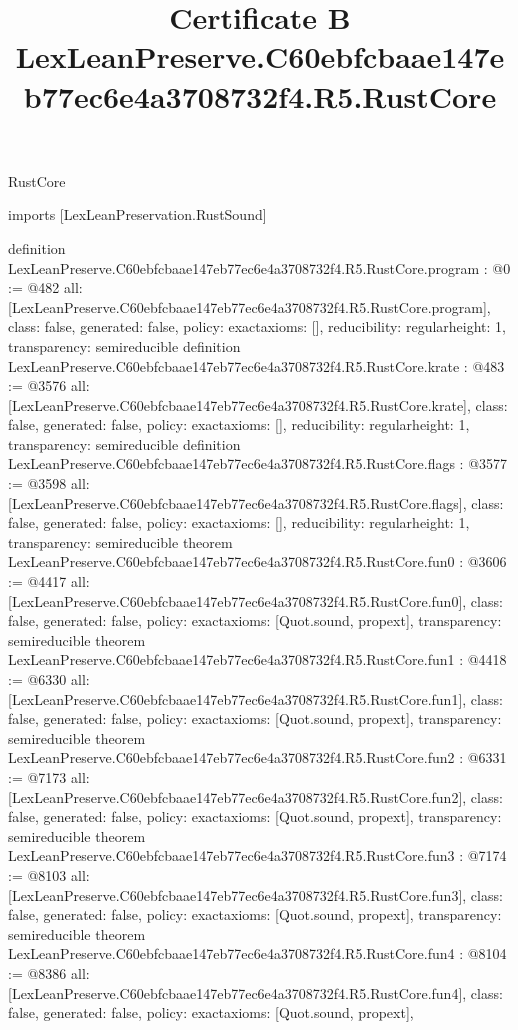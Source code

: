 \begin{lexlean}{RustCore}
\title{Certificate B LexLeanPreserve.C60ebfcbaae147eb77ec6e4a3708732f4.R5.RustCore}
\begin{coremodule}
imports [LexLeanPreservation.RustSound]

definition LexLeanPreserve.C60ebfcbaae147eb77ec6e4a3708732f4.R5.RustCore.program : @0 := @482 {
  all: [LexLeanPreserve.C60ebfcbaae147eb77ec6e4a3708732f4.R5.RustCore.program],
  class: false,
  generated: false,
  policy: exact{axioms: []},
  reducibility: regular{height: 1},
  transparency: semireducible
}
definition LexLeanPreserve.C60ebfcbaae147eb77ec6e4a3708732f4.R5.RustCore.krate : @483 := @3576 {
  all: [LexLeanPreserve.C60ebfcbaae147eb77ec6e4a3708732f4.R5.RustCore.krate],
  class: false,
  generated: false,
  policy: exact{axioms: []},
  reducibility: regular{height: 1},
  transparency: semireducible
}
definition LexLeanPreserve.C60ebfcbaae147eb77ec6e4a3708732f4.R5.RustCore.flags : @3577 := @3598 {
  all: [LexLeanPreserve.C60ebfcbaae147eb77ec6e4a3708732f4.R5.RustCore.flags],
  class: false,
  generated: false,
  policy: exact{axioms: []},
  reducibility: regular{height: 1},
  transparency: semireducible
}
theorem LexLeanPreserve.C60ebfcbaae147eb77ec6e4a3708732f4.R5.RustCore.fun0 : @3606 := @4417 {
  all: [LexLeanPreserve.C60ebfcbaae147eb77ec6e4a3708732f4.R5.RustCore.fun0],
  class: false,
  generated: false,
  policy: exact{axioms: [Quot.sound, propext]},
  transparency: semireducible
}
theorem LexLeanPreserve.C60ebfcbaae147eb77ec6e4a3708732f4.R5.RustCore.fun1 : @4418 := @6330 {
  all: [LexLeanPreserve.C60ebfcbaae147eb77ec6e4a3708732f4.R5.RustCore.fun1],
  class: false,
  generated: false,
  policy: exact{axioms: [Quot.sound, propext]},
  transparency: semireducible
}
theorem LexLeanPreserve.C60ebfcbaae147eb77ec6e4a3708732f4.R5.RustCore.fun2 : @6331 := @7173 {
  all: [LexLeanPreserve.C60ebfcbaae147eb77ec6e4a3708732f4.R5.RustCore.fun2],
  class: false,
  generated: false,
  policy: exact{axioms: [Quot.sound, propext]},
  transparency: semireducible
}
theorem LexLeanPreserve.C60ebfcbaae147eb77ec6e4a3708732f4.R5.RustCore.fun3 : @7174 := @8103 {
  all: [LexLeanPreserve.C60ebfcbaae147eb77ec6e4a3708732f4.R5.RustCore.fun3],
  class: false,
  generated: false,
  policy: exact{axioms: [Quot.sound, propext]},
  transparency: semireducible
}
theorem LexLeanPreserve.C60ebfcbaae147eb77ec6e4a3708732f4.R5.RustCore.fun4 : @8104 := @8386 {
  all: [LexLeanPreserve.C60ebfcbaae147eb77ec6e4a3708732f4.R5.RustCore.fun4],
  class: false,
  generated: false,
  policy: exact{axioms: [Quot.sound, propext]},
}
\end{coremodule}
\end{lexlean}
